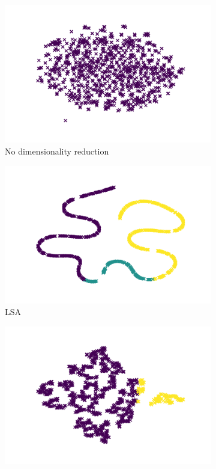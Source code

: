 \begin{figure}
  \centering
  \begin{subfigure}{.3\textwidth}
      \centering
      \includegraphics[width=\linewidth]{imgs/mean_shift.png}
      \caption{No dimensionality reduction}
      \label{fig:mean_shift_no_dim}
  \end{subfigure}
  \begin{subfigure}{.3\textwidth}
    \centering
    \includegraphics[width=\linewidth]{imgs/mean_shift_lsa.png}
    \caption{LSA}
    \label{fig:mean_shift_lsa}
  \end{subfigure}%
  \begin{subfigure}{.3\textwidth}
    \centering
    \includegraphics[width=\linewidth]{imgs/mean_shift_spectral.png}

\end{subfigure}
\end{figure}
